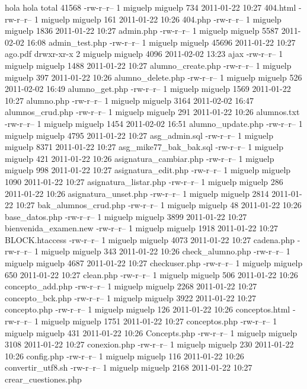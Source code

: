 hola
hola
total 41568
-rw-r--r--  1 miguelp miguelp      734 2011-01-22 10:27 404.html
-rw-r--r--  1 miguelp miguelp      161 2011-01-22 10:26 404.php
-rw-r--r--  1 miguelp miguelp     1836 2011-01-22 10:27 admin.php
-rw-r--r--  1 miguelp miguelp     5587 2011-02-02 16:08 admin_test.php
-rw-r--r--  1 miguelp miguelp    45696 2011-01-22 10:27 ago.pdf
drwxr-xr-x  2 miguelp miguelp     4096 2011-02-02 13:23 ajax
-rw-r--r--  1 miguelp miguelp     1488 2011-01-22 10:27 alumno_create.php
-rw-r--r--  1 miguelp miguelp      397 2011-01-22 10:26 alumno_delete.php
-rw-r--r--  1 miguelp miguelp      526 2011-02-02 16:49 alumno_get.php
-rw-r--r--  1 miguelp miguelp     1569 2011-01-22 10:27 alumno.php
-rw-r--r--  1 miguelp miguelp     3164 2011-02-02 16:47 alumnos_crud.php
-rw-r--r--  1 miguelp miguelp      291 2011-01-22 10:26 alumnos.txt
-rw-r--r--  1 miguelp miguelp     1454 2011-02-02 16:51 alumno_update.php
-rw-r--r--  1 miguelp miguelp     4795 2011-01-22 10:27 asg_admin.sql
-rw-r--r--  1 miguelp miguelp     8371 2011-01-22 10:27 asg_mike77_bak_bak.sql
-rw-r--r--  1 miguelp miguelp      421 2011-01-22 10:26 asignatura_cambiar.php
-rw-r--r--  1 miguelp miguelp      998 2011-01-22 10:27 asignatura_edit.php
-rw-r--r--  1 miguelp miguelp     1090 2011-01-22 10:27 asignatura_listar.php
-rw-r--r--  1 miguelp miguelp      286 2011-01-22 10:26 asignatura_unset.php
-rw-r--r--  1 miguelp miguelp     2814 2011-01-22 10:27 bak_alumnos_crud.php
-rw-r--r--  1 miguelp miguelp       48 2011-01-22 10:26 base_datos.php
-rw-r--r--  1 miguelp miguelp     3899 2011-01-22 10:27 bienvenida_examen.new
-rw-r--r--  1 miguelp miguelp     1918 2011-01-22 10:27 BLOCK.htaccess
-rw-r--r--  1 miguelp miguelp     4073 2011-01-22 10:27 cadena.php
-rw-r--r--  1 miguelp miguelp      343 2011-01-22 10:26 check_alumno.php
-rw-r--r--  1 miguelp miguelp     4687 2011-01-22 10:27 checkuser.php
-rw-r--r--  1 miguelp miguelp      650 2011-01-22 10:27 clean.php
-rw-r--r--  1 miguelp miguelp      506 2011-01-22 10:26 concepto_add.php
-rw-r--r--  1 miguelp miguelp     2268 2011-01-22 10:27 concepto_bck.php
-rw-r--r--  1 miguelp miguelp     3922 2011-01-22 10:27 concepto.php
-rw-r--r--  1 miguelp miguelp      126 2011-01-22 10:26 conceptos.html
-rw-r--r--  1 miguelp miguelp     1751 2011-01-22 10:27 conceptos.php
-rw-r--r--  1 miguelp miguelp      431 2011-01-22 10:26 Concepts.php
-rw-r--r--  1 miguelp miguelp     3108 2011-01-22 10:27 conexion.php
-rw-r--r--  1 miguelp miguelp      230 2011-01-22 10:26 config.php
-rw-r--r--  1 miguelp miguelp      116 2011-01-22 10:26 convertir_utf8.sh
-rw-r--r--  1 miguelp miguelp     2168 2011-01-22 10:27 crear_cuestiones.php
